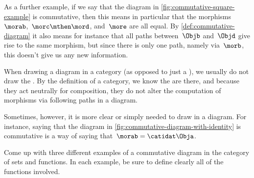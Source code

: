 As a further example, if we say that the diagram in \cref{fig:commutative-square-example} is commutative, then this means in particular that the morphisms~$\morab$,~$\morc \mthen \mord$, and~$\more$ are all equal.
By \cref{def:commutative-diagram} it also means for instance that all paths between~$\Objb$ and~$\Objd$ give rise to the same morphism, but since there is only one path, namely via~$\morb$, this doesn't give us any new information.

\begin{remark}
    When drawing a diagram in a category (as opposed to just a ), we usually do not draw the .
    By the definition of a category, we know the  are there, and because they act neutrally for composition, they do not alter the computation of morphisms via following paths in a diagram.

    Sometimes, however, it is more clear or simply needed to draw  in a diagram.
    For instance, saying that the diagram in \cref{fig:commutative-diagram-with-identity} is commutative is a way of saying that~$\morab = \catidat\Obja$.
\end{remark}


\begin{gradedexercise}
    \label{ex:InventingCommDiagrams}

    Come up with three different examples of a commutative diagram in the category of sets and functions.
    In each example, be sure to define clearly all of the functions involved.

\end{gradedexercise}




